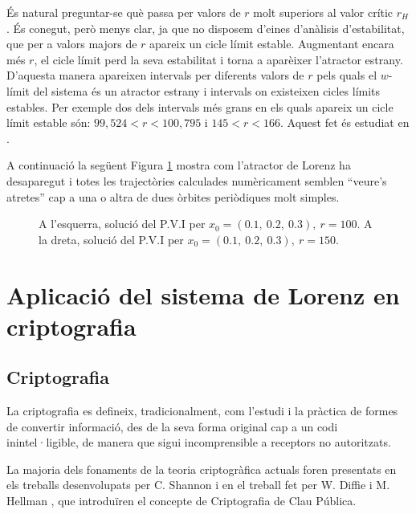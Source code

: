 \documentclass[11pt,a4paper,openright,oneside]{article}
\numberwithin{equation}{section}
\theoremstyle{definition}
\begin{document}
És natural preguntar-se què passa per valors de $r$ molt superiors al valor crític $r_H$. És conegut, però menys clar, ja que no disposem d'eines d'anàlisis d'estabilitat, que per a valors majors de $r$ apareix un cicle límit estable. Augmentant encara més $r$, el cicle límit perd la seva estabilitat i torna a aparèixer l'atractor estrany. D'aquesta manera apareixen intervals per diferents valors de $r$ pels quals el $w$-límit del sistema és un atractor estrany i intervals on existeixen cicles límits estables. Per exemple dos dels intervals més grans en els quals apareix un cicle límit estable són: $99,524<r<100,795$ i $145<r<166$. Aquest fet és estudiat en \cite{Sparrow}. 

A continuació la següent Figura \ref{fig:cicles_estable} mostra com l'atractor de Lorenz ha desaparegut i totes les trajectòries calculades numèricament semblen “veure's atretes” cap a una o altra de dues òrbites periòdiques molt simples.

\begin{figure}[htbp]
    \centering
    \qquad
    \caption{A l'esquerra, solució del P.V.I per $x_0=(0.1,\ 0.2, \ 0.3), \ r=100$. A la dreta, solució del P.V.I per $x_0=(0.1, \ 0.2, \ 0.3), \ r=150$.}
    \label{fig:cicles_estable}
\end{figure} 

\newpage

\section{Aplicació del sistema de Lorenz en criptografia}

\subsection{Criptografia} \label{sssec: Criptografia}
La criptografia es defineix, tradicionalment, com l'estudi i la pràctica de formes de convertir informació, des de la seva forma original cap a un codi inintel·ligible, de manera que sigui incomprensible a receptors no autoritzats.

La majoria dels fonaments de la teoria criptogràfica actuals foren presentats en els treballs desenvolupats per C. Shannon \cite{Shannon_1}\cite{Shannon_2} i en el treball fet per W. Diffie i M. Hellman \cite{Hellmann}, que introduïren el concepte de Criptografia de Clau Pública. 
\end{document}
